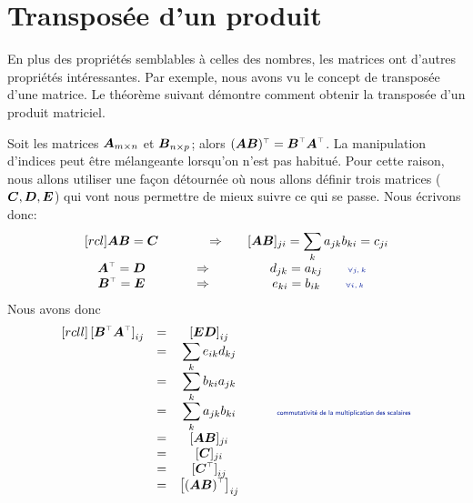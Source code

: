  \section{Transposée d'un produit}
En plus des propriétés semblables à celles des nombres, les matrices ont d'autres propriétés intéressantes.  Par exemple, nous avons vu le concept de transposée d'une matrice.  Le théorème suivant démontre comment obtenir la transposée d'un produit matriciel.

\begin{theo}
Soit les matrices $\boldsymbol{A}_{m\times n}$ et $\boldsymbol{B}_{n\times p}$; alors
$\transp{(\matA\matB)} = \transp{\matB}\transp{\matA}$.
\proof
La manipulation d'indices peut être mélangeante lorsqu'on n'est pas habitué.  Pour cette raison, nous allons utiliser une façon
détournée où nous allons définir trois matrices ($\boldsymbol{C}, \boldsymbol{D}, \boldsymbol{E}$) qui vont nous permettre de
mieux suivre ce qui se passe.   Nous écrivons donc:
\[
\begin{matrix}[rcl]
\matA\matB = \matC \qquad&\Rightarrow& [\matA\matB]_{ji} =\displaystyle\sum_k a_{jk}b_{ki}= c_{ji} \\
\transp{\matA} = \matD  \qquad&\Rightarrow\qquad& d_{jk} = a_{kj}  \qquad\explain{ $\forall j, k$}\\
\transp{\matB} = \matE  \qquad&\Rightarrow\qquad& e_{ki} = b_{ik} \qquad\explain{ $\forall i, k$}\\
\end{matrix}
\]
Nous avons donc
\[
\begin{matrix}[rcll]
\left[\transp{\matB}\transp{\matA}\right]_{ij} &=& \left[\matE\matD\right]_{ij} \\
	&=& \displaystyle \sum_k e_{ik} d_{kj} \\
	&=& \displaystyle \sum_k b_{ki} a_{jk} \\
	&=& \displaystyle \sum_k a_{jk} b_{ki} &\qquad\explain{commutativité de la multiplication des scalaires}\\
	&=& [\matA\matB]_{ji} \\
	&=& [\matC]_{ji} \\
	&=& \left[\transp{\matC}\right]_{ij} \\
	&=&\left[ \transp{\left(\matA\matB\right)}\right]_{ij}
\end{matrix}
\]
\cqfd
\end{theo}

